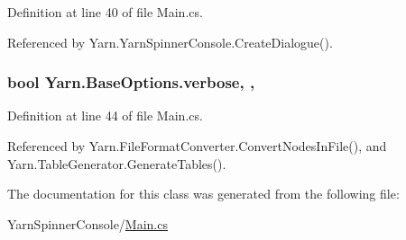 Definition at line 40 of file Main.\-cs.



Referenced by Yarn.\-Yarn\-Spinner\-Console.\-Create\-Dialogue().

\hypertarget{a00031_ada4d83d1756918f362d55f6649b82b17}{
\subsubsection[{verbose}]{\setlength{\rightskip}{0pt plus 5cm}bool Yarn.\-Base\-Options.\-verbose\hspace{0.3cm}{\ttfamily [get]}, {\ttfamily [set]}, {\ttfamily [inherited]}}}\label{a00031_ada4d83d1756918f362d55f6649b82b17}


Definition at line 44 of file Main.\-cs.



Referenced by Yarn.\-File\-Format\-Converter.\-Convert\-Nodes\-In\-File(), and Yarn.\-Table\-Generator.\-Generate\-Tables().



The documentation for this class was generated from the following file\-:\begin{DoxyCompactItemize}
\item 
Yarn\-Spinner\-Console/\hyperlink{a00307}{Main.\-cs}\end{DoxyCompactItemize}
